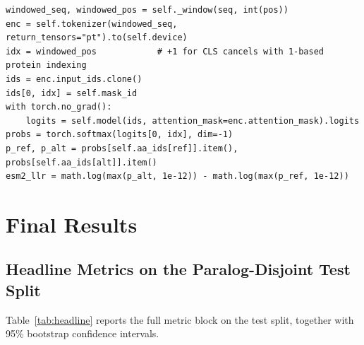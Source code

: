 \documentclass[11pt,a4paper,oneside]{report}
\begin{document}
\begin{lstlisting}[caption={ESM-2 zero-shot scoring from \texttt{src/esm2\_scorer.py}.},label={lst:esm2}]
windowed_seq, windowed_pos = self._window(seq, int(pos))
enc = self.tokenizer(windowed_seq, return_tensors="pt").to(self.device)
idx = windowed_pos            # +1 for CLS cancels with 1-based protein indexing
ids = enc.input_ids.clone()
ids[0, idx] = self.mask_id
with torch.no_grad():
    logits = self.model(ids, attention_mask=enc.attention_mask).logits
probs = torch.softmax(logits[0, idx], dim=-1)
p_ref, p_alt = probs[self.aa_ids[ref]].item(), probs[self.aa_ids[alt]].item()
esm2_llr = math.log(max(p_alt, 1e-12)) - math.log(max(p_ref, 1e-12))
\end{lstlisting}

\section{Final Results}
\label{sec:impl-results}

\subsection{Headline Metrics on the Paralog-Disjoint Test Split}
\label{sec:res-headline}

Table~\ref{tab:headline} reports the full metric
block on the test split, together with 95\% bootstrap
confidence intervals.
\end{document}
